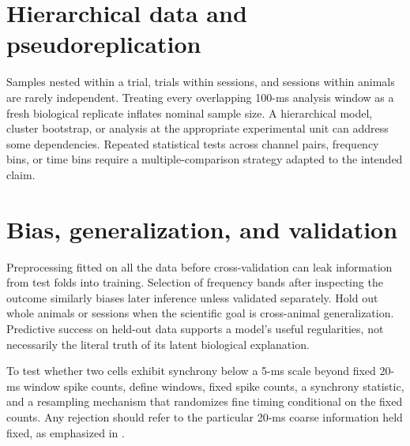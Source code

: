 \section{Hierarchical data and pseudoreplication}
Samples nested within a trial, trials within sessions, and sessions within animals are rarely independent. Treating every overlapping 100-ms analysis window as a fresh biological replicate inflates nominal sample size. A hierarchical model, cluster bootstrap, or analysis at the appropriate experimental unit can address some dependencies. Repeated statistical tests across channel pairs, frequency bins, or time bins require a multiple-comparison strategy adapted to the intended claim.

\section{Bias, generalization, and validation}
Preprocessing fitted on all the data before cross-validation can leak information from test folds into training. Selection of frequency bands after inspecting the outcome similarly biases later inference unless validated separately. Hold out whole animals or sessions when the scientific goal is cross-animal generalization. Predictive success on held-out data supports a model's useful regularities, not necessarily the literal truth of its latent biological explanation.

\begin{workedexample}
To test whether two cells exhibit synchrony below a 5-ms scale beyond fixed 20-ms window spike counts, define windows, fixed spike counts, a synchrony statistic, and a resampling mechanism that randomizes fine timing conditional on the fixed counts. Any rejection should refer to the particular 20-ms coarse information held fixed, as emphasized in \cite{Amarasingham2012}.
\end{workedexample}
